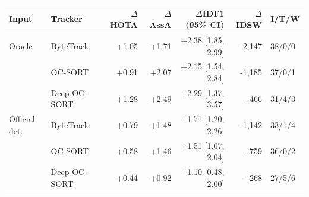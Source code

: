 \begin{tabular}{llrrrrl}
\toprule
Input & Tracker & $\Delta$HOTA & $\Delta$AssA & $\Delta$IDF1 (95\% CI) & $\Delta$IDSW & I/T/W \\
\midrule
Oracle & ByteTrack & +1.05 & +1.71 & +2.38 [1.85, 2.99] & -2,147 & 38/0/0 \\
 & OC-SORT & +0.91 & +2.07 & +2.15 [1.54, 2.84] & -1,185 & 37/0/1 \\
 & Deep OC-SORT & +1.28 & +2.49 & +2.29 [1.37, 3.57] & -466 & 31/4/3 \\
\midrule
Official det. & ByteTrack & +0.79 & +1.48 & +1.71 [1.20, 2.26] & -1,142 & 33/1/4 \\
 & OC-SORT & +0.58 & +1.46 & +1.51 [1.07, 2.04] & -759 & 36/0/2 \\
 & Deep OC-SORT & +0.44 & +0.92 & +1.10 [0.48, 2.00] & -268 & 27/5/6 \\
\bottomrule
\end{tabular}
